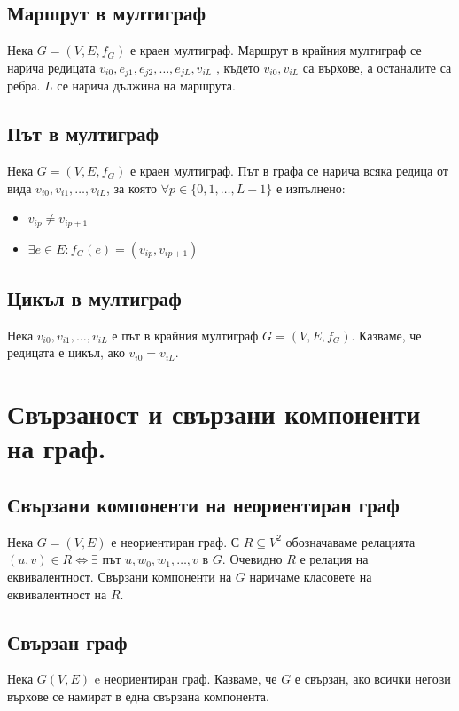 \documentclass[fleqn,12pt]{article}
\begin{document}
\begin{flushleft}
\subsection{Маршрут в мултиграф}
Нека $G = (V, E, f_G)$ е краен мултиграф. Маршрут в крайния мултиграф се нарича
редицата $v_{i0} , e_{j1} , e_{j2} , \dots , e_{jL} , v_{iL}$ , където $v_{i0}, v_{iL}$ са върхове, а останалите са ребра. 
$L$ се нарича дължина на маршрута.

\subsection{Път в мултиграф}
Нека $G = (V, E, f_G)$ е краен мултиграф. Път в графа се нарича всяка редица от вида
$v_{i0}, v_{i1}, \dots, v_{iL}$, за която $\forall p \in \{ 0, 1, \dots, L - 1 \}$ е изпълнено:
\begin{itemize}
	\item $v_{ip} \neq v_{ip+1}$
	\item $\exists e \in E : f_G(e) = (v_{ip}, v_{ip+1})$
\end{itemize}

\subsection{Цикъл в мултиграф}
Нека $v_{i0}, v_{i1}, \dots, v_{iL}$ е път в крайния мултиграф $G = (V, E, f_G)$.
Казваме, че редицата е цикъл, ако $v_{i0} = v_{iL}$.

\section{Свързаност и свързани компоненти на граф.} 

\subsection{Свързани компоненти на неориентиран граф}
Нека $G = (V, E)$ е неориентиран граф. 
С $R \subseteq V^2$ обозначаваме релацията $ (u, v) \in R \Leftrightarrow \exists $ път $u, w_0, w_1, \dots, v$ в $G$.
Очевидно $R$ е релация на еквивалентност. Свързани компоненти на $G$ наричаме класовете на еквивалентност на $R$.

\subsection{Свързан граф}
Нека $G(V, E)$ e неориентиран граф. Казваме, че $G$ е свързан, ако всички негови върхове
се намират в една свързана компонента.


\end{flushleft}
\end{document}
